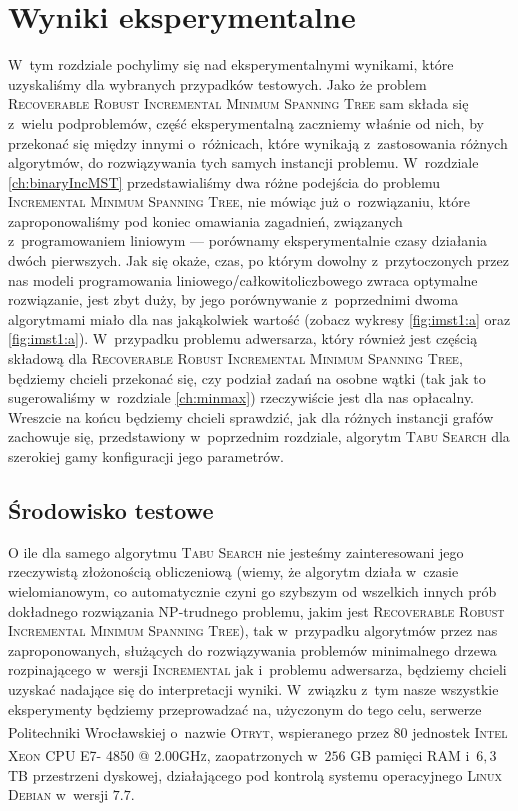 \chapter{Wyniki eksperymentalne}\label{ch:exp}
\thispagestyle{chapterBeginStyle}

W~tym rozdziale pochylimy się nad eksperymentalnymi wynikami, które uzyskaliśmy dla wybranych przypadków testowych. Jako że problem \textsc{Recoverable Robust Incremental Minimum Spanning Tree} sam składa się z~wielu podproblemów, część eksperymentalną zaczniemy właśnie od nich, by przekonać się między innymi o~różnicach, które wynikają z~zastosowania różnych algorytmów, do rozwiązywania tych samych instancji problemu. W~rozdziale \ref{ch:binaryIncMST} przedstawialiśmy dwa różne podejścia do problemu \textsc{Incremental Minimum Spanning Tree}, nie mówiąc już o~rozwiązaniu, które zaproponowaliśmy pod koniec omawiania zagadnień, związanych z~programowaniem liniowym --- porównamy eksperymentalnie czasy działania dwóch pierwszych. Jak się okaże, czas, po którym dowolny z~przytoczonych przez nas modeli programowania liniowego/całkowitoliczbowego zwraca optymalne rozwiązanie, jest zbyt duży, by jego porównywanie z~poprzednimi dwoma algorytmami miało dla nas jakąkolwiek wartość (zobacz wykresy \ref{fig:imst1:a} oraz \ref{fig:imst1:a}). W~przypadku problemu adwersarza, który również jest częścią składową dla \textsc{Recoverable Robust Incremental Minimum Spanning Tree}, będziemy chcieli przekonać się, czy podział zadań na osobne wątki (tak jak to sugerowaliśmy w~rozdziale \ref{ch:minmax}) rzeczywiście jest dla nas opłacalny. Wreszcie na końcu będziemy chcieli sprawdzić, jak dla różnych instancji grafów zachowuje się, przedstawiony w~poprzednim rozdziale, algorytm \textsc{Tabu Search} dla szerokiej gamy konfiguracji jego parametrów.

\section{Środowisko testowe}

O ile dla samego algorytmu \textsc{Tabu Search} nie jesteśmy zainteresowani jego rzeczywistą złożonością obliczeniową (wiemy, że algorytm działa w~czasie wielomianowym, co automatycznie czyni go szybszym od wszelkich innych prób dokładnego rozwiązania \textsc{NP}-trudnego problemu, jakim jest \textsc{Recoverable Robust Incremental Minimum Spanning Tree}), tak w~przypadku algorytmów przez nas zaproponowanych, służących do rozwiązywania problemów minimalnego drzewa rozpinającego w~wersji \textsc{Incremental} jak i~problemu adwersarza, będziemy chcieli uzyskać nadające się do interpretacji wyniki. W~związku z~tym nasze wszystkie eksperymenty będziemy przeprowadzać na, użyczonym do tego celu, serwerze Politechniki Wrocławskiej o~nazwie \textsc{Otryt}, wspieranego przez $80$ jednostek \textsc{Intel\textsuperscript{\textregistered} Xeon\textsuperscript{\textregistered} CPU E7- 4850  @ 2.00GHz}, zaopatrzonych w~$256$ \textsc{GB} pamięci \textsc{RAM} i~$6,3$ \textsc{TB} przestrzeni dyskowej, działającego pod kontrolą systemu operacyjnego \textsc{Linux Debian} w~wersji $7.7$.

